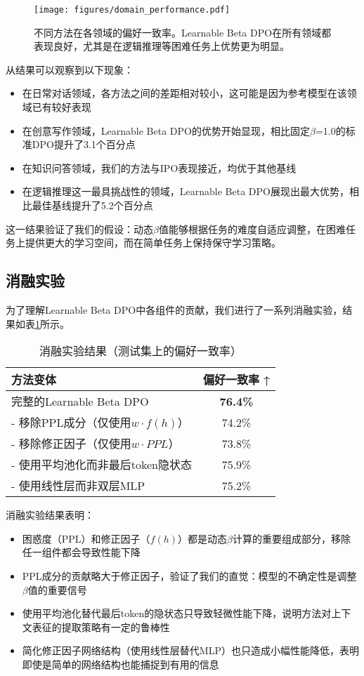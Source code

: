 \begin{figure}[h]
    \centering
    \texttt{[image: figures/domain\_performance.pdf]}
    \caption{不同方法在各领域的偏好一致率。Learnable Beta DPO在所有领域都表现良好，尤其是在逻辑推理等困难任务上优势更为明显。}
    \label{fig:domain_performance}
\end{figure}

从结果可以观察到以下现象：

\begin{itemize}
    \item 在日常对话领域，各方法之间的差距相对较小，这可能是因为参考模型在该领域已有较好表现
    \item 在创意写作领域，Learnable Beta DPO的优势开始显现，相比固定$\beta$=1.0的标准DPO提升了3.1个百分点
    \item 在知识问答领域，我们的方法与IPO表现接近，均优于其他基线
    \item 在逻辑推理这一最具挑战性的领域，Learnable Beta DPO展现出最大优势，相比最佳基线提升了5.2个百分点
\end{itemize}

这一结果验证了我们的假设：动态$\beta$值能够根据任务的难度自适应调整，在困难任务上提供更大的学习空间，而在简单任务上保持保守学习策略。

\subsection{消融实验}
为了理解Learnable Beta DPO中各组件的贡献，我们进行了一系列消融实验，结果如表\ref{tab:ablation}所示。

\begin{table}[h]
\centering
\caption{消融实验结果（测试集上的偏好一致率）}
\label{tab:ablation}
\begin{tabular}{lc}
\toprule
\textbf{方法变体} & \textbf{偏好一致率} ↑ \\
\midrule
完整的Learnable Beta DPO & \textbf{76.4\%} \\
- 移除PPL成分（仅使用$w \cdot f(h)$） & 74.2\% \\
- 移除修正因子（仅使用$w \cdot PPL$） & 73.8\% \\
- 使用平均池化而非最后token隐状态 & 75.9\% \\
- 使用线性层而非双层MLP & 75.2\% \\
\bottomrule
\end{tabular}
\end{table}

消融实验结果表明：

\begin{itemize}
    \item 困惑度（PPL）和修正因子（$f(h)$）都是动态$\beta$计算的重要组成部分，移除任一组件都会导致性能下降
    \item PPL成分的贡献略大于修正因子，验证了我们的直觉：模型的不确定性是调整$\beta$值的重要信号
    \item 使用平均池化替代最后token的隐状态只导致轻微性能下降，说明方法对上下文表征的提取策略有一定的鲁棒性
    \item 简化修正因子网络结构（使用线性层替代MLP）也只造成小幅性能降低，表明即使是简单的网络结构也能捕捉到有用的信息
\end{itemize}

